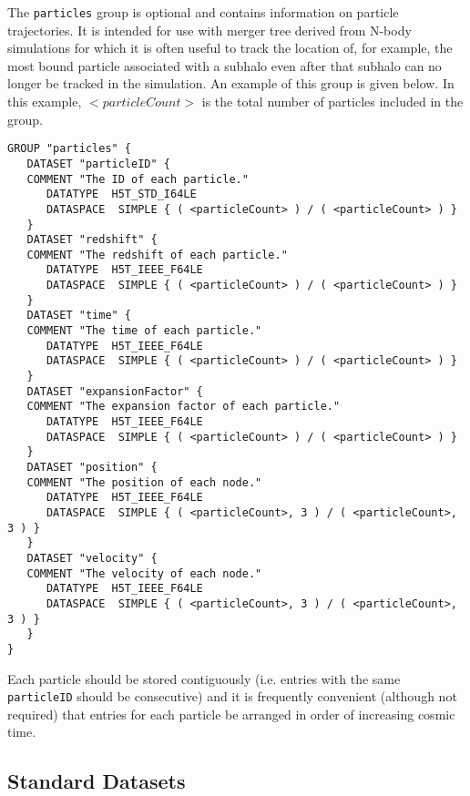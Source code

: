 The {\tt particles} group is optional and contains information on particle trajectories. It is intended for use with merger tree derived from N-body simulations for which it is often useful to track the location of, for example, the most bound particle associated with a subhalo even after that subhalo can no longer be tracked in the simulation. An example of this group is given below. In this example, {\tt $<particleCount>$} is the total number of particles included in the group.

\begin{verbatim}
GROUP "particles" {
   DATASET "particleID" {
   COMMENT "The ID of each particle."
      DATATYPE  H5T_STD_I64LE
      DATASPACE  SIMPLE { ( <particleCount> ) / ( <particleCount> ) }
   }
   DATASET "redshift" {
   COMMENT "The redshift of each particle."
      DATATYPE  H5T_IEEE_F64LE
      DATASPACE  SIMPLE { ( <particleCount> ) / ( <particleCount> ) }
   }
   DATASET "time" {
   COMMENT "The time of each particle."
      DATATYPE  H5T_IEEE_F64LE
      DATASPACE  SIMPLE { ( <particleCount> ) / ( <particleCount> ) }
   }
   DATASET "expansionFactor" {
   COMMENT "The expansion factor of each particle."
      DATATYPE  H5T_IEEE_F64LE
      DATASPACE  SIMPLE { ( <particleCount> ) / ( <particleCount> ) }
   }
   DATASET "position" {
   COMMENT "The position of each node."
      DATATYPE  H5T_IEEE_F64LE
      DATASPACE  SIMPLE { ( <particleCount>, 3 ) / ( <particleCount>, 3 ) }
   }
   DATASET "velocity" {
   COMMENT "The velocity of each node."
      DATATYPE  H5T_IEEE_F64LE
      DATASPACE  SIMPLE { ( <particleCount>, 3 ) / ( <particleCount>, 3 ) }
   }
}
\end{verbatim}

Each particle should be stored contiguously (i.e. entries with the same {\tt particleID} should be consecutive) and it is frequently convenient (although not required) that entries for each particle be arranged in order of increasing cosmic time.

\subsection{Standard Datasets}

